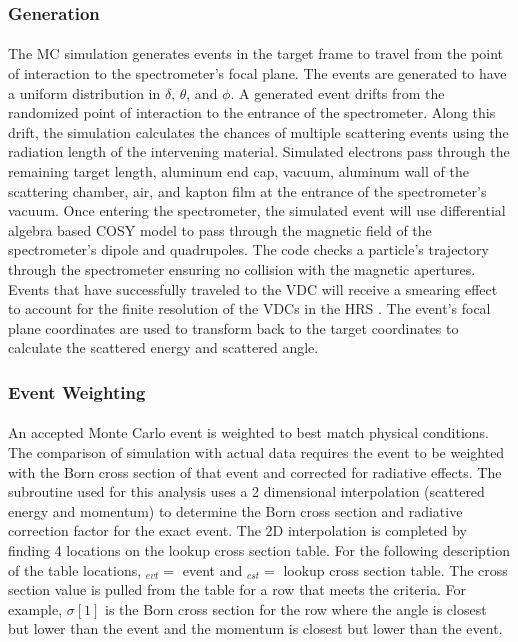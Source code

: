 \subsubsection{Generation}
\paragraph{}The MC simulation generates events in the target frame to travel from the point of interaction to the spectrometer's focal plane. The events are generated to have a uniform distribution in $\delta$, $\theta$, and $\phi$. A generated event drifts from the randomized point of interaction to the entrance of the spectrometer. Along this drift, the simulation calculates the chances of multiple scattering events using the radiation length of the intervening material. Simulated electrons pass through the remaining target length, aluminum end cap, vacuum, aluminum wall of the scattering chamber, air, and kapton film at the entrance of the spectrometer's vacuum. Once entering the spectrometer, the simulated event will use differential algebra based COSY model to pass through the magnetic field of the spectrometer's dipole and quadrupoles. The code checks a particle's trajectory through the spectrometer ensuring no collision with the magnetic apertures.  Events that have successfully traveled to the VDC will receive a smearing effect to account for the finite resolution of the VDCs in the HRS \cite{HallA}. The event's focal plane coordinates are used to transform back to the target coordinates to calculate the scattered energy and scattered angle.\\ 
\subsubsection{Event Weighting}
\paragraph{}An accepted Monte Carlo event is weighted to best match physical conditions. The comparison of simulation with actual data requires the event to be weighted with the Born cross section of that event and corrected for radiative effects. The subroutine used for this analysis uses a 2 dimensional interpolation (scattered energy and momentum) to determine the Born cross section and radiative correction factor for the exact event. The 2D interpolation is completed by finding 4 locations on the lookup cross section table. For the following description of the table locations, $_{evt} =$ event and $_{cst} =$ lookup cross section table. The cross section value is pulled from the table for a row that meets the criteria. For example, $\sigma[1]$ is the Born cross section for the row where the angle is closest but lower than the event and the momentum is closest but lower than the event. 

